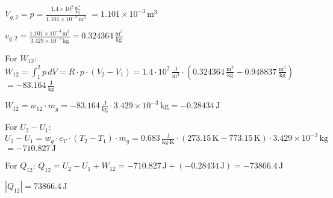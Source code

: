 \( V_{g,2} = p = \frac{1.4 \times 10^2 \, \frac{\text{m}^3}{\text{kg}}}{1.101 \times 10^{-3} \, \text{m}^3} \)  
\( = 1.101 \times 10^{-3} \, \text{m}^3 \)  

\( v_{g,2} = \frac{1.101 \times 10^{-3} \, \text{m}^3}{3.429 \times 10^{-3} \, \text{kg}} = 0.324364 \, \frac{\text{m}^3}{\text{kg}} \)  

For \( W_{12} \):  
\( W_{12} = \int_{1}^{2} p \, dV = R \cdot p \cdot (V_{2} - V_{1}) = 1.4 \cdot 10^2 \, \frac{\text{J}}{\text{m}^3} \cdot (0.324364 \, \frac{\text{m}^3}{\text{kg}} - 0.948837 \, \frac{\text{m}^3}{\text{kg}}) \)  
\( = -83.164 \, \frac{\text{J}}{\text{kg}} \)  

\( W_{12} = w_{12} \cdot m_{g} = -83.164 \, \frac{\text{J}}{\text{kg}} \cdot 3.429 \times 10^{-3} \, \text{kg} = -0.28434 \, \text{J} \)  

For \( U_{2} - U_{1} \):  
\( U_{2} - U_{1} = w_{g} \cdot c_{V} \cdot (T_{2} - T_{1}) \cdot m_{g} = 0.683 \, \frac{\text{J}}{\text{kg·K}} \cdot (273.15 \, \text{K} - 773.15 \, \text{K}) \cdot 3.429 \times 10^{-3} \, \text{kg} \)  
\( = -710.827 \, \text{J} \)  

For \( Q_{12} \):  
\( Q_{12} = U_{2} - U_{1} + W_{12} = -710.827 \, \text{J} + (-0.28434 \, \text{J}) = -73866.4 \, \text{J} \)  

\( |Q_{12}| = 73866.4 \, \text{J} \)